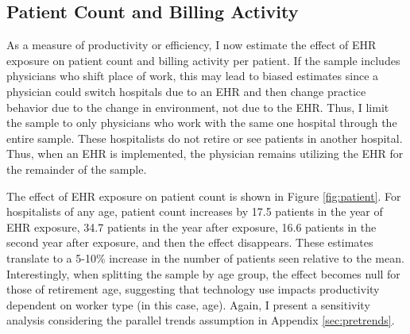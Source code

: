 \documentclass[12pt]{article}
\begin{document}
\subsection{Patient Count and Billing Activity}\label{sec:patientcount}

As a measure of productivity or efficiency, I now estimate the effect of EHR exposure on patient count and billing activity per patient. If the sample includes physicians who shift place of work, this may lead to biased estimates since a physician could switch hospitals due to an EHR and then change practice behavior due to the change in environment, not due to the EHR. Thus, I limit the sample to only physicians who work with the same one hospital through the entire sample. These hospitalists do not retire or see patients in another hospital. Thus, when an EHR is implemented, the physician remains utilizing the EHR for the remainder of the sample. 

The effect of EHR exposure on patient count is shown in Figure \ref{fig:patient}. For hospitalists of any age, patient count increases by 17.5 patients in the year of EHR exposure, 34.7 patients in the year after exposure, 16.6 patients in the second year after exposure, and then the effect disappears. These estimates translate to a 5-10\% increase in the number of patients seen relative to the mean. Interestingly, when splitting the sample by age group, the effect becomes null for those of retirement age, suggesting that technology use impacts productivity dependent on worker type (in this case, age). Again, I present a sensitivity analysis considering the parallel trends assumption in Appendix \ref{sec:pretrends}. 
\end{document}
